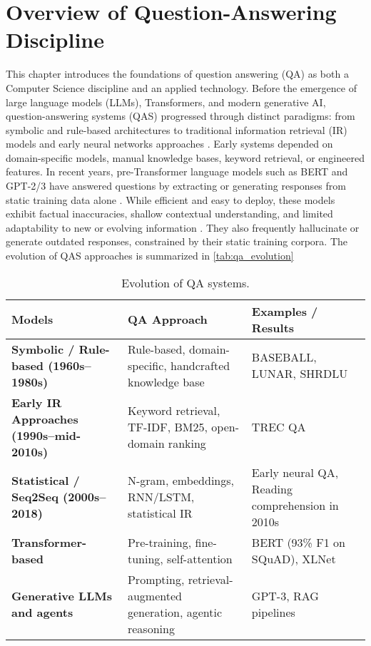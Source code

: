\chapter{Overview of Question-Answering Discipline}
\label{chap:QAS}
\sloppy
\begin{spacing}{1.5}

This chapter introduces the foundations of question answering (QA) as both a Computer Science discipline and an applied technology. Before the emergence of large language models (LLMs), Transformers, and modern generative AI, question-answering systems (QAS) progressed through distinct paradigms: from symbolic and rule-based architectures to traditional information retrieval (IR) models and early neural networks approaches \citep{jurafsky_chapter_2024, antoniou_survey_2022}. Early systems depended on domain-specific models, manual knowledge bases, keyword retrieval, or engineered features. In recent years, pre-Transformer language models such as BERT and GPT-2/3 have answered questions by extracting or generating responses from static training data alone \citep{caballero_brief_2021}. While efficient and easy to deploy, these models exhibit factual inaccuracies, shallow contextual understanding, and limited adaptability to new or evolving information \citep{alanazi_question_2021}. They also frequently hallucinate or generate outdated responses, constrained by their static training corpora. The evolution of QAS approaches is summarized in \autoref{tab:qa_evolution}

\begin{table}[H]
\centering
\begin{tabularx}{\textwidth}{>{\raggedright\arraybackslash\bfseries}X >{\raggedright\arraybackslash}X >{\raggedright\arraybackslash}X}
\toprule
\textbf{Models} & \textbf{QA Approach} & \textbf{Examples / Results}\\
\midrule
Symbolic / Rule-based (1960s–1980s) & Rule-based, domain-specific, handcrafted knowledge base & BASEBALL, LUNAR, SHRDLU \\
Early IR Approaches (1990s–mid-2010s) & Keyword retrieval, TF-IDF, BM25, open-domain ranking & TREC QA \\
Statistical / Seq2Seq (2000s–2018) & N-gram, embeddings, RNN/LSTM, statistical IR & Early neural QA, Reading comprehension in 2010s \\
Transformer-based & Pre-training, fine-tuning, self-attention & BERT (93\% F1 on SQuAD), XLNet \\
Generative LLMs and agents & Prompting, retrieval-augmented generation, agentic reasoning & GPT-3, RAG pipelines \\
\bottomrule
\end{tabularx}
\caption{Evolution of QA systems.}
\label{tab:qa_evolution}
\end{table}


\end{spacing}
